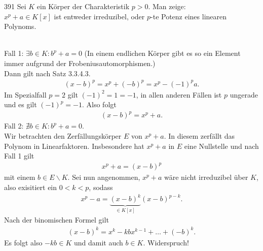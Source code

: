 \begin{algebraUE}{391}
Sei $K$ ein Körper der Charakteristik $p > 0$. Man zeige: \\
$x^p + a \in K[x]$ ist entweder irreduzibel, oder $p$-te Potenz eines linearen
Polynoms.
\end{algebraUE}

\begin{solution}\leavevmode \\
Fall 1: $\exists b \in K: b^p + a = 0$ (In einem endlichen Körper gibt es
so ein Element immer aufgrund der Frobeniusautomorphismen.) \\
Dann gilt nach Satz 3.3.4.3.
\begin{align*}
  (x - b)^p = x^p + (-b)^p = x^p - (-1)^pa.
\end{align*}
Im Spezialfall $p = 2$ gilt $(-1)^2 = 1 = -1$, in allen anderen Fällen ist $p$ ungerade
und es gilt $(-1)^p = -1$. Also folgt
\begin{align*}
  (x - b)^p = x^p + a.
\end{align*}
Fall 2: $\nexists b \in K: b^p + a = 0$. \\
Wir betrachten den Zerfällungskörper $E$ von $x^p + a$. In diesem zerfällt
das Polynom in Linearfaktoren. Insbesondere hat $x^p + a$ in $E$ eine Nullstelle
und nach Fall 1 gilt
\begin{align*}
  x^p + a = (x - b)^p
\end{align*}
mit einem $b \in E\backslash K$.
Sei nun angenommen, $x^p + a$ wäre nicht
irreduzibel über $K$, also exisitiert ein $0 < k < p$, sodass
\begin{align*}
  x^p - a = \underbrace{(x - b)^k}_{\in K[x]}(x - b)^{p - k}.
\end{align*}
Nach der binomischen Formel gilt
\begin{align*}
  (x - b)^k = x^k - kbx^{k-1} + \dots + (-b)^k.
\end{align*}
Es folgt also $-kb \in K$ und damit auch $b \in K$. Widerspruch!
\end{solution}

